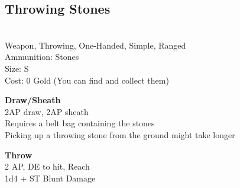\subsection{Throwing Stones}\label{weapon:throwingStones}\\
Weapon, Throwing, One-Handed, Simple, Ranged\\
Ammunition: Stones\\
Size: S\\
Cost: 0 Gold (You can find and collect them)

\textbf{Draw/Sheath}\\
2AP draw, 2AP sheath\\
Requires a belt bag containing the stones\\
Picking up a throwing stone from the ground might take longer

\textbf{Throw}\\
2 AP, DE to hit,  Reach\\
1d4 + \texttimes ST Blunt Damage

